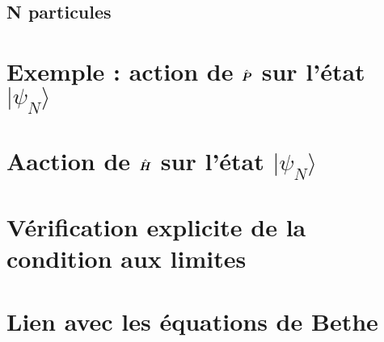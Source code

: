 \section{N particules}\label{annex:N.part}


\chapter{Exemple : action de $\hat{\bm{P}}$ sur l’état $\vert \psi_N\rangle$}


\chapter{Aaction de $\hat{\bm{H}}$ sur l’état $\vert \psi_N\rangle$}


\chapter{Vérification explicite de la condition aux limites}

\chapter{Lien avec les équations de Bethe}



\newpage
\printindex
\printindex[pers]
			            
